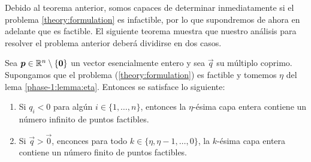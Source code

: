Debido al teorema anterior, somos capaces de determinar inmediatamente si el problema
\eqref{theory:formulation} es infactible, por lo que supondremos de ahora en adelante que es
factible. El siguiente teorema muestra que nuestro análisis para resolver el problema anterior
deberá dividirse en dos casos.
\begin{theorem}
	\label{theory:th:feasibility}
	Sea $\boldsymbol{p} \in \mathbb{R}^n \setminus \lbrace \boldsymbol{0} \rbrace $ un vector esencialmente entero y sea
	$\vec{q}$ su múltiplo coprimo. Supongamos que el problema (\ref{theory:formulation}) es factible
	y tomemos $\eta$ del lema \ref{phase-1:lemma:eta}. Entonces se satisface lo siguiente:
	\begin{enumerate}
		\item Si $q_i < 0$ para algún $i \in \lbrace 1, \ldots, n \rbrace$, entonces la $\eta$-ésima
			capa entera contiene un número infinito de puntos factibles.
		\item Si $\vec{q} > \vec{0}$, enconces para todo $k \in \lbrace \eta, \eta - 1, \ldots, 0
			\rbrace$, la $k$-ésima capa entera contiene un número finito de puntos factibles.
	\end{enumerate}
\end{theorem}
